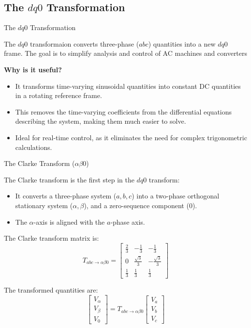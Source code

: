 \subsection{The $dq0$ Transformation}
\begin{frame}{The $dq0$ Transformation}

The $dq0$ transformaion converts three-phase ($abc$) quantities into a new $dq0$ frame.
The goal is to simplify analysis and control of AC machines and converters

\textbf{Why is it useful?}
\begin{itemize}
    \item It transforms time-varying sinusoidal quantities into constant DC quantities in a rotating reference frame.
    \item This removes the time-varying coefficients from the differential equations describing the system, making them much easier to solve.
    \item Ideal for real-time control, as it eliminates the need for complex trigonometric calculations.
\end{itemize}
\end{frame}

\begin{frame}[allowframebreaks]{The Clarke Transform ($\alpha\beta0$)}

The Clarke transform is the first step in the $dq0$ transform:
\begin{itemize}
    \item It converts a three-phase system ($a,b,c$) into a two-phase orthogonal stationary system ($\alpha, \beta$), and a zero-sequence component ($0$).
    \item The $\alpha$-axis is aligned with the $a$-phase axis.
\end{itemize}

The Clarke transform matrix is:
    $$
    T_{abc \to \alpha\beta0} = \begin{bmatrix}
    \frac{2}{3} & -\frac{1}{3} & -\frac{1}{3} \\
    0 & \frac{\sqrt{3}}{3} & -\frac{\sqrt{3}}{3} \\
    \frac{1}{3} & \frac{1}{3} & \frac{1}{3}
    \end{bmatrix}
    $$

The transformed quantities are:
    $$
    \begin{bmatrix}
    V_\alpha \\ V_\beta \\ V_0
    \end{bmatrix} = T_{abc \to \alpha\beta0} \begin{bmatrix}
    V_a \\ V_b \\ V_c
    \end{bmatrix}
    $$
\end{frame}

